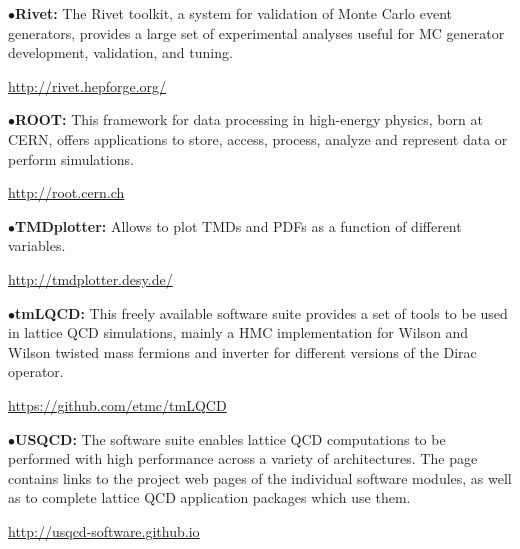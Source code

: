 \medskip

\item{$\bullet$}{\bf Rivet:}
The Rivet toolkit, a system for validation of Monte Carlo event generators, provides a large set of experimental analyses useful for MC generator development, validation, and tuning.
	\item{}\qquad\url{http://rivet.hepforge.org/}

\medskip

\item{$\bullet$}{\bf ROOT:}
This framework for data processing in high-energy physics, born at CERN, offers applications to store, access, process, analyze and represent data or perform simulations.
	\item{}\qquad\url{http://root.cern.ch}

\medskip

\item{$\bullet$}{\bf TMDplotter:}
Allows to plot TMDs and PDFs as a function of different variables.
	\item{}\qquad\url{http://tmdplotter.desy.de/}

\medskip

\item{$\bullet$}{\bf tmLQCD:} 
This freely available software suite provides a set of tools to be used in lattice QCD simulations, mainly a HMC implementation for Wilson and Wilson twisted mass fermions and inverter for different versions of the Dirac operator.
	\item{}\qquad\url{https://github.com/etmc/tmLQCD}

\medskip

\item{$\bullet$}{\bf USQCD:} 
The software suite enables lattice QCD computations to be performed with high performance across a variety of architectures. The page contains links to the project web pages of the individual software modules, as well as to complete lattice QCD application packages which use them.
	\item{}\qquad\url{http://usqcd-software.github.io}

\medskip



